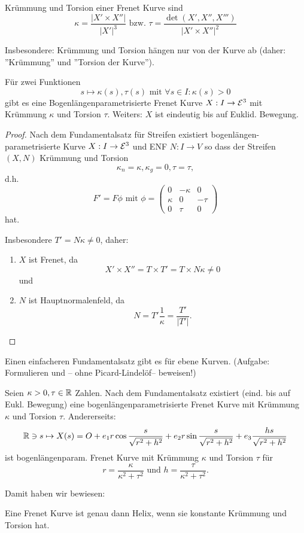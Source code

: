 \begin{remark}
	Krümmung und Torsion einer Frenet Kurve sind \[ \kappa = \frac{|X' \times X''|}{|X'|^3} \text{ bzw. }  \tau = \frac{\det(X',X'',X''')}{|X' \times X''|^2} \]
	
	Insbesondere: Krümmung und Torsion hängen nur von der Kurve ab (daher: ''Krümmung'' und ''Torsion der Kurve'').
\end{remark}

\begin{theorem}
	Für zwei Funktionen \[ s \mapsto \kappa(s), \tau(s) \text{ mit } \forall s \in I: \kappa(s) > 0 \] gibt es eine Bogenlängenparametrisierte Frenet Kurve $X: I \rightarrow \mathcal E ^3$ mit Krümmung $\kappa$ und Torsion $\tau$. 
	Weiters: $X$ ist eindeutig bis auf Euklid. Bewegung.
\end{theorem}

\begin{proof}
	Nach dem Fundamentalsatz für Streifen existiert bogenlängen-parametrisierte Kurve $X: I \rightarrow \mathcal E^3$ und ENF $N: I \rightarrow V$ so dass der Streifen $ (X,N)$ Krümmung und Torsion \[  \kappa_n = \kappa, \kappa_g = 0, \tau = \tau,  \] d.h.\[F' = F\phi \text{ mit } \phi = \begin{pmatrix}
	0 & - \kappa & 0\\
\kappa & 0 & - \tau \\
0 & \tau & 0
	\end{pmatrix} \] hat.
	
	Insbesondere $T' = N\kappa \not = 0$, daher:
	\begin{enumerate}
	\item $X$ ist Frenet, da
	\[ X' \times X'' = T \times T' = T \times N\kappa \not = 0 \]
	und \item  $N$ ist Hauptnormalenfeld, da \[ N = T'\frac{1}{\kappa} = \frac{T'}{|T'|}. \]
	
	\end{enumerate}
\end{proof}

\begin{remark}
	Einen einfacheren Fundamentalsatz gibt es für ebene Kurven. (Aufgabe: Formulieren und -- ohne Picard-Lindelöf-- beweisen!)
\end{remark}

\begin{example}
	Seien $\kappa > 0, \tau \in \mathbb R$ Zahlen. Nach dem Fundamentalsatz existiert (eind. bis auf Eukl. Bewegung) eine bogenlängenparametrisierte Frenet Kurve mit Krümmung $\kappa$ und Torsion $\tau$. Andererseits: \[ \mathbb R \ni s \mapsto X(s) = O + e_1 r \cos \frac{s}{\sqrt{r^2+h^2}} + e_2 r \sin \frac{s}{\sqrt{r^2+h^2}} + e_3 \frac{hs}{\sqrt{r^2 + h^2}}\] ist bogenlängenparam. Frenet Kurve mit Krümmung $\kappa$ und Torsion $\tau$ für \[ r= \frac{\kappa}{\kappa^2 + \tau^2} \text{ und } h = \frac{ \tau}{\kappa^2 + \tau^2}. \]
	
	Damit haben wir bewiesen:
\end{example}

\begin{theorem}
	Eine Frenet Kurve ist genau dann Helix, wenn sie konstante Krümmung und Torsion hat.
\end{theorem}

